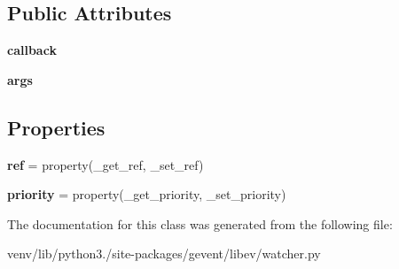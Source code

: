 \subsection*{Public Attributes}
\begin{DoxyCompactItemize}
\item 
\mbox{\label{classgevent_1_1libev_1_1watcher_1_1watcher_a797442133e99f994a25dd272bc4d7d42}} 
{\bfseries callback}
\item 
\mbox{\label{classgevent_1_1libev_1_1watcher_1_1watcher_acba5af8d9a320d54b2e2367e9b92c6f6}} 
{\bfseries args}
\end{DoxyCompactItemize}
\subsection*{Properties}
\begin{DoxyCompactItemize}
\item 
\mbox{\label{classgevent_1_1libev_1_1watcher_1_1watcher_aafe5a1c5392275c0b66c5b5f3a4061dd}} 
{\bfseries ref} = property(\+\_\+get\+\_\+ref, \+\_\+set\+\_\+ref)
\item 
\mbox{\label{classgevent_1_1libev_1_1watcher_1_1watcher_ac95b6ed0454b97eb0f2a51064ac0f732}} 
{\bfseries priority} = property(\+\_\+get\+\_\+priority, \+\_\+set\+\_\+priority)
\end{DoxyCompactItemize}


The documentation for this class was generated from the following file\+:\begin{DoxyCompactItemize}
\item 
venv/lib/python3./site-\/packages/gevent/libev/watcher.\+py\end{DoxyCompactItemize}

